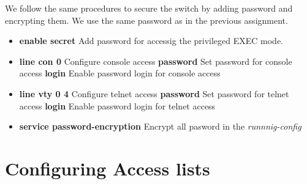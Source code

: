 \documentclass{article}
\begin{document}
We follow the same procedures to secure the switch by adding password and encrypting them. We use the same password as in the previous assignment.

\begin{itemize}
    \item \textbf{enable secret} Add password for accessig the privileged EXEC mode.
    \item \textbf{line con 0} Configure console access 
        \subitem \textbf{password} Set password for console access
        \subitem \textbf{login} Enable password login for console access
    \item \textbf{line vty 0 4} Configure telnet access
        \subitem \textbf{password} Set password for telnet access
        \subitem \textbf{login} Enable password login for telnet access
     \item \textbf{service password-encryption} Encrypt all pasword in the \textit{runnnig-config}
\end{itemize}

\section{Configuring Access lists}
\end{document}
